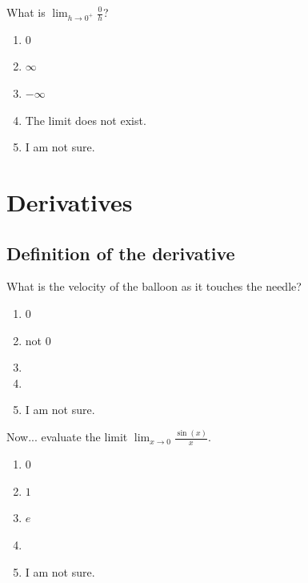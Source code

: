 \documentclass[aspectratio=169, 14pt, t]{beamer}  %
\begin{document}
\begin{poll}
  What is \(\lim_{h \to 0^{+}} \frac{0}{h}\)?

  \begin{enumerate}
    \item \(0\)
    \item \(\infty\)
    \item \(-\infty\)
    \item The limit does not exist.
    \item I am not sure.
  \end{enumerate}
\end{poll}

\section{Derivatives}

\subsection{Definition of the derivative}

\begin{poll}
  What is the velocity of the balloon as it touches the needle?

  \begin{enumerate}
    \item \(0\)
    \item not \(0\)
    \item
    \item
    \item I am not sure.
  \end{enumerate}
\end{poll}

\begin{poll}
  Now... evaluate the limit \(\lim_{x \to 0} \frac{\sin(x)}{x}\).

  \begin{enumerate}
    \item \(0\)
    \item \(1\)
    \item \(e\)
    \item
    \item I am not sure.
  \end{enumerate}
\end{poll}
\end{document}
